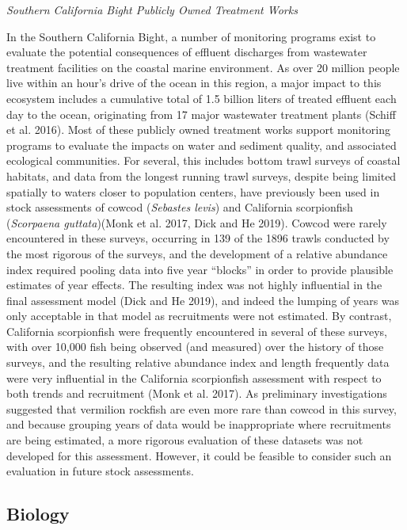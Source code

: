 \documentclass[
  english,
  a4paper,
]{article}
\begin{document}
\emph{Southern California Bight Publicly Owned Treatment Works}

In the Southern California Bight, a number of monitoring programs exist to evaluate the potential consequences of effluent discharges from wastewater treatment facilities on the coastal marine environment. As over 20 million people live within an hour's drive of the ocean in this region, a major impact to this ecosystem includes a cumulative total of 1.5 billion liters of treated effluent each day to the ocean, originating from 17 major wastewater treatment plants (Schiff et al. 2016). Most of these publicly owned treatment works support monitoring programs to evaluate the impacts on water and sediment quality, and associated ecological communities. For several, this includes bottom trawl surveys of coastal habitats, and data from the longest running trawl surveys, despite being limited spatially to waters closer to population centers, have previously been used in stock assessments of cowcod (\emph{Sebastes levis}) and California scorpionfish (\emph{Scorpaena guttata})(Monk et al. 2017, Dick and He 2019). Cowcod were rarely encountered in these surveys, occurring in 139 of the 1896 trawls conducted by the most rigorous of the surveys, and the development of a relative abundance index required pooling data into five year ``blocks'' in order to provide plausible estimates of year effects. The resulting index was not highly influential in the final assessment model (Dick and He 2019), and indeed the lumping of years was only acceptable in that model as recruitments were not estimated. By contrast, California scorpionfish were frequently encountered in several of these surveys, with over 10,000 fish being observed (and measured) over the history of those surveys, and the resulting relative abundance index and length frequently data were very influential in the California scorpionfish assessment with respect to both trends and recruitment (Monk et al. 2017). As preliminary investigations suggested that vermilion rockfish are even more rare than cowcod in this survey, and because grouping years of data would be inappropriate where recruitments are being estimated, a more rigorous evaluation of these datasets was not developed for this assessment. However, it could be feasible to consider such an evaluation in future stock assessments.

\hypertarget{biology}{%
\subsection{Biology}\label{biology}}
\end{document}
